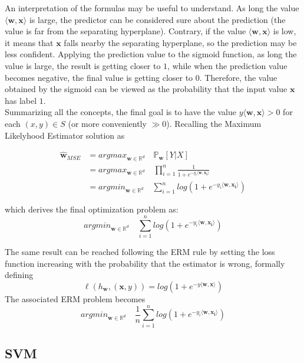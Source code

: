 An interpretation of the formulas may be useful to understand. As long the value $\langle \mathbf{w}, \mathbf{x} \rangle$ is large, the predictor can be considered sure about the prediction (the value is far from the separating hyperplane). Contrary, if the value $\langle \mathbf{w}, \mathbf{x} \rangle$ is low, it means that $\mathbf{x}$ falls nearby the separating hyperplane, so the prediction may be less confident. Applying the prediction value to the sigmoid function, as long the value is large, the result is getting closer to $1$, while when the prediction value becomes negative, the final value is getting closer to $0$.
Therefore, the value obtained by the sigmoid can be viewed as the probability that the input value $\mathbf{x}$ has label $1$.\\
Summarizing all the concepts, the final goal is to have the value $y \langle \mathbf{w}, \mathbf{x} \rangle > 0$ for each $(x, y) \in S$ (or more conveniently $\gg 0$). Recalling the Maximum Likelyhood Estimator solution as

\begin{align*}
 \hat{\mathbf{w}}_{MSE} &= argmax_{\mathbf{w} \in \mathbb{R}^d} \quad \mathbb{P}_\mathbf{w}[Y | X]	\\
 						&= argmax_{\mathbf{w} \in \mathbb{R}^d} \quad \prod_{i=1}^{n} \frac{1}{1 + e^{-y_i \langle \mathbf{w}, \mathbf{x_i} \rangle}}	\\
 						&= argmin_{\mathbf{w} \in \mathbb{R}^d} \quad \sum_{i=1}^{n} log(1 + e^{-y_i \langle \mathbf{w}, \mathbf{x_i} \rangle})
\end{align*}

which derives the final optimization problem as:
\[ argmin_{\mathbf{w} \in \mathbb{R}^d} \quad \sum_{i=1}^{n} log(1 + e^{-y_i \langle \mathbf{w}, \mathbf{x_i} \rangle}) \]

The same result can be reached following the ERM rule by setting the loss function increasing with the probability that the estimator is wrong, formally defining
\[ \ell (h_\mathbf{w}, (\mathbf{x}, y)) = log(1 + e^{-y \langle \mathbf{w}, \mathbf{x} \rangle}) \]
The associated ERM problem becomes
\[ argmin_{\mathbf{w} \in \mathbb{R}^d} \quad \frac{1}{n} \sum_{i=1}^{n} log(1 + e^{-y_i \langle \mathbf{w}, \mathbf{x_i} \rangle}) \]



\subsection{SVM}

